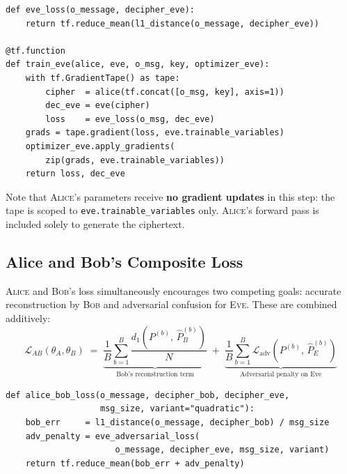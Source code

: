 \documentclass[12pt, a4paper]{article}
\newcommand{\alice}{\textsc{Alice}}
\newcommand{\bob}{\textsc{Bob}}
\newcommand{\eve}{\textsc{Eve}}
\newcommand{\thetaA}{\theta_{\!A}}
\newcommand{\thetaB}{\theta_{\!B}}
\newcommand{\code}[1]{\texttt{\color{CodeRed}#1}}
\begin{document}
\begin{lstlisting}[caption={Eve's loss and isolated training step}]
def eve_loss(o_message, decipher_eve):
    return tf.reduce_mean(l1_distance(o_message, decipher_eve))

@tf.function
def train_eve(alice, eve, o_msg, key, optimizer_eve):
    with tf.GradientTape() as tape:
        cipher  = alice(tf.concat([o_msg, key], axis=1))
        dec_eve = eve(cipher)
        loss    = eve_loss(o_msg, dec_eve)
    grads = tape.gradient(loss, eve.trainable_variables)
    optimizer_eve.apply_gradients(
        zip(grads, eve.trainable_variables))
    return loss, dec_eve
\end{lstlisting}

Note that \alice{}'s parameters receive \textbf{no gradient updates} in
this step: the tape is scoped to \code{eve.trainable\_variables} only.
\alice{}'s forward pass is included solely to generate the ciphertext.

\subsection{Alice and Bob's Composite Loss}
\label{subsec:ab_loss}

\alice{} and \bob{}'s loss simultaneously encourages two competing goals:
accurate reconstruction by \bob{} and adversarial confusion for \eve{}.
These are combined additively:
%
\begin{equation}
  \mathcal{L}_{AB}(\thetaA, \thetaB)
  \;=\;
  \underbrace{
    \frac{1}{B}\sum_{b=1}^B
    \frac{d_1(P^{(b)},\, \hat{P}_B^{(b)})}{N}
  }_{\text{Bob's reconstruction term}}
  \;+\;
  \underbrace{
    \frac{1}{B}\sum_{b=1}^B
    \mathcal{L}_{\mathrm{adv}}(P^{(b)},\, \hat{P}_E^{(b)})
  }_{\text{Adversarial penalty on Eve}}
  \label{eq:ab_loss_full}
\end{equation}

\begin{lstlisting}[caption={Alice and Bob's composite loss function}]
def alice_bob_loss(o_message, decipher_bob, decipher_eve,
                   msg_size, variant="quadratic"):
    bob_err     = l1_distance(o_message, decipher_bob) / msg_size
    adv_penalty = eve_adversarial_loss(
                      o_message, decipher_eve, msg_size, variant)
    return tf.reduce_mean(bob_err + adv_penalty)
\end{lstlisting}
\end{document}
